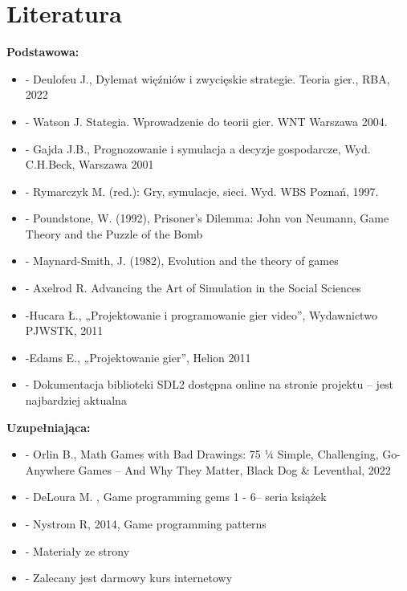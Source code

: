 \documentclass[12pt, a4paper]{article}
\begin{document}
\section{Literatura}

\textbf{Podstawowa:}
\begin{itemize}
  \item - Deulofeu J., Dylemat więźniów i zwycięskie strategie. Teoria gier., RBA, 2022
  \item - Watson J. Stategia. Wprowadzenie do teorii gier. WNT Warszawa 2004.
  \item - Gajda J.B., Prognozowanie i symulacja a decyzje gospodarcze, Wyd. C.H.Beck, Warszawa 2001
  \item - Rymarczyk M. (red.): Gry, symulacje, sieci. Wyd. WBS Poznań, 1997.
  \item - Poundstone, W. (1992), Prisoner's Dilemma: John von Neumann, Game Theory and the Puzzle of the Bomb
  \item - Maynard-Smith, J. (1982), Evolution and the theory of games
  \item - Axelrod R. Advancing the Art of Simulation in the Social Sciences
  \item -Hucara Ł., „Projektowanie i programowanie gier video”, Wydawnictwo PJWSTK, 2011
  \item -Edams E., „Projektowanie gier”, Helion 2011
  \item - Dokumentacja biblioteki SDL2 dostępna online na stronie projektu – jest najbardziej aktualna
\end{itemize}

\textbf{Uzupełniająca:}
\begin{itemize}
  \item - Orlin B., Math Games with Bad Drawings: 75 ¼ Simple, Challenging, Go-Anywhere Games – And Why They Matter,  Black Dog \& Leventhal, 2022
  \item - DeLoura M. ,  Game programming gems 1 - 6– seria książek
  \item - Nystrom R, 2014, Game programming patterns
  \item - Materiały ze strony
  \item - Zalecany jest darmowy kurs internetowy
\end{itemize}
\end{document}
